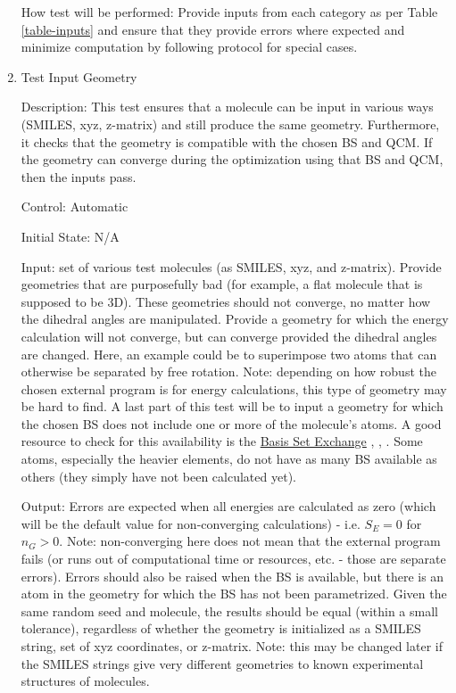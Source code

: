 \documentclass[12pt, titlepage]{article}
\begin{document}
\begin{enumerate}
How test will be performed: Provide inputs from each category as per Table 
\ref{table-inputs} and ensure that they provide errors where expected and 
minimize computation by following protocol for special cases.

\item Test Input Geometry \label{test-input-geom}

Description: This test ensures that a molecule can be input in various ways 
(SMILES, xyz, z-matrix) and still produce the same geometry. Furthermore, it 
checks that the geometry is compatible with the chosen BS and QCM. If the 
geometry can converge during the optimization using that BS and QCM, then the 
inputs pass.

Control: Automatic

Initial State: N/A

Input: set of various test molecules (as SMILES, xyz, and z-matrix). Provide 
geometries that are purposefully bad (for example, a flat molecule that is 
supposed to be 3D). These geometries should not converge, no matter how the 
dihedral angles are manipulated. Provide a geometry for which the energy 
calculation will not converge, but can converge provided the dihedral angles 
are changed. Here, an example could be to superimpose two atoms that can 
otherwise be separated by free rotation. Note: depending on how robust the 
chosen external program is for energy calculations, this type of geometry may 
be hard to find. A last part of this test will be to input a geometry for which 
the chosen BS does not include one or more of the molecule's atoms. A 
good resource to check for this availability is the 
\href{https://bse.pnl.gov/bse/portal}{Basis Set Exchange}  
\cite{basis-set-exchange-ref1}, \cite{basis-set-exchange-ref2}, 
\cite{basis-set-exchange-web}.
 Some atoms, 
especially the heavier elements, do not have as many BS available as others 
(they simply have not been calculated yet).

Output: Errors are expected when all energies are calculated as zero (which 
will be the default value for non-converging calculations) - i.e. $S_E = 0$ for 
$n_G > 0$. Note: non-converging here does not mean that the external program 
fails (or runs out of computational time or resources, etc. - those are 
separate errors). Errors should also be raised when the BS is available, but 
there is an atom in the geometry for which the BS has not been parametrized. 
Given the same random seed and molecule, the results should be equal (within a 
small tolerance), regardless of whether the geometry is initialized as a SMILES 
string, set of xyz coordinates, or z-matrix. Note: this may be changed later if 
the SMILES strings give very different geometries to known experimental 
structures of molecules.


\end{enumerate}
\end{document}
